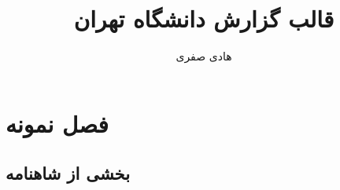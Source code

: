 \documentclass[12pt]{tehranReport}
\title{قالب گزارش دانشگاه تهران}
\author{هادی صفری}
\begin{document}
\maketitlepage

\tableofcontents
\newpage

\chapter{فصل نمونه}
\section{بخشی از شاهنامه}
\ptext
\end{document}
